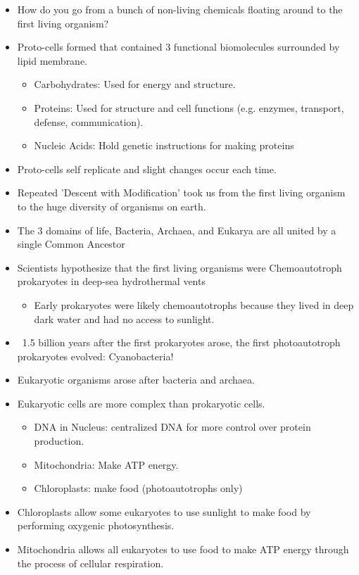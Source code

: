 \documentclass[10pt, oneside]{article}
\begin{document}
\begin{itemize}

\item How do you go from a bunch of non-living chemicals floating around to the first living organism?
\item Proto-cells formed that contained 3 functional biomolecules surrounded by lipid membrane.
\begin{itemize}
\item Carbohydrates: Used for energy and structure.
\item Proteins: Used for structure and cell functions (e.g. enzymes, transport, defense, communication).
\item Nucleic Acids: Hold genetic instructions for making proteins
\end{itemize}
\item Proto-cells self replicate and slight changes occur each time.
\item Repeated 'Descent with Modification' took us from the first living organism to the huge diversity of organisms on earth.
\item The 3 domains of life, Bacteria, Archaea, and Eukarya are all united by a single Common Ancestor
\item Scientists hypothesize that the first living organisms were Chemoautotroph prokaryotes in deep-sea hydrothermal vents
\begin{itemize}
\item Early prokaryotes were likely chemoautotrophs because they lived in deep dark water and had no access to sunlight.
\end{itemize}
\item ~1.5 billion years after the first prokaryotes arose, the first photoautotroph prokaryotes evolved: Cyanobacteria!
\item Eukaryotic organisms arose after bacteria and archaea.
\item Eukaryotic cells are more complex than prokaryotic cells.
\begin{itemize}
\item DNA in Nucleus: centralized DNA for more control over protein production.
\item Mitochondria: Make ATP energy.
\item Chloroplasts: make food (photoautotrophs only)
\end{itemize}
\item Chloroplasts allow some eukaryotes to use sunlight to make food by performing oxygenic photosynthesis.
\item Mitochondria allows all eukaryotes to use food to make ATP energy through the process of cellular respiration.

\end{itemize}
\end{document}
